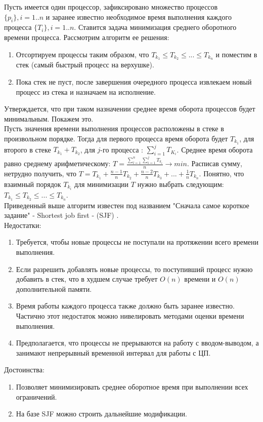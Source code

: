 \label{package:sjf}
Пусть имеется один процессор, зафиксировано множество процессов $\{p_i\}, i = 1..n$ и заранее известно необходимое время выполнения каждого процесса $\{T_i\}, i =1..n$. Ставится задача минимизация среднего оборотного времени процесса. Рассмотрим алгоритм ее решения:
\begin{enumerate}[label=---]
\item Отсортируем процессы таким образом, что $T_{k_1} \leq T_{k_2} \leq ... \leq T_{k_n}$ и поместим в стек (самый быстрый процесс на верхушке).
\item Пока стек не пуст, после завершения очередного процесса извлекаем новый процесс из стека и назначаем на исполнение.
\end{enumerate}
Утверждается, что при таком назначении среднее время оборота процессов будет минимальным. Покажем это.\\
Пусть значения времени выполнения процессов расположены в стеке в произвольном порядке. Тогда для первого процесса время оборота будет $T_{k_1}$, для второго в стеке $T_{k_1} + T_{k_2}$, для $j$-го процесса : $\sum_{i=1}^j{T_{K_i}}$. Среднее время оборота равно среднему арифметическому: $T = \frac{\sum_{l = 1}^n{\sum_{i = 1}^{j}{T_{k_i}}}}{n} \rightarrow min$. Расписав сумму, нетрудно получить, что $T = T_{k_1} + \frac{n-1}{n}T_{k_2} + \frac{n-2}{n}T_{k_3} + ... + \frac{1}{n}T_{k_n}$. Понятно, что взаимный порядок $T_{k_i}$ для минимизации $T$ нужно выбрать следующим: $T_{k_1} \leq T_{k_2} \leq ... \leq T_{k_n}$.\\
Приведенный выше алгоритм известен под названием "Сначала самое короткое задание" - Shortest job first - (SJF) \cite{tanenbaum}.\\
Недостатки:
\begin{enumerate}[label=---]
\item Требуется, чтобы новые процессы не поступали на протяжении всего времени выполнения.
\item Если разрешить добавлять новые процессы, то поступивший процесс нужно добавить в стек, что в худшем случае требует $O(n)$ времени и $O(n)$ дополнительной памяти.
\item Время работы каждого процесса также должно быть заранее известно. Частично этот недостаток можно нивелировать методами оценки времени выполнения.
\item Предполагается, что процессы не прерываются на работу с вводом-выводом, а занимают непрерывный временной интервал для работы с ЦП.
\end{enumerate}
Достоинства:
\begin{enumerate}[label=---]
\item Позволяет минимизировать среднее оборотное время при выполнении всех ограничений.
\item На базе SJF можно строить дальнейшие модификации.
\end{enumerate}
